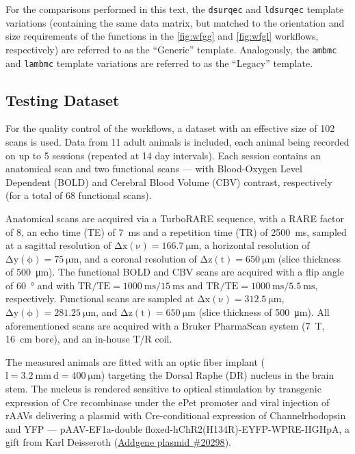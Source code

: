 For the comparisons performed in this text, the \textcolor{mg}{\texttt{dsurqec}} and \textcolor{mg}{\texttt{ldsurqec}} template variations (containing the same data matrix, but matched to the orientation and size requirements of the functions in the \cref{fig:wfgg} and \cref{fig:wfgl} workflows, respectively) are referred to as the “Generic” template.
Analogously, the \textcolor{mg}{\texttt{ambmc}} and \textcolor{mg}{\texttt{lambmc}} template variations are referred to as the “Legacy” template.

\subsection{Testing Dataset}

For the quality control of the workflows, a dataset with an effective size of 102 scans is used.
Data from 11 adult animals is included, each animal being recorded on up to 5 sessions (repeated at 14 day intervals).
Each session contains an anatomical scan and two functional scans --- with Blood-Oxygen Level Dependent (BOLD) \cite{Ogawa1990} and Cerebral Blood Volume (CBV) \cite{Marota1999} contrast, respectively (for a total of 68 functional scans).

Anatomical scans are acquired via a TurboRARE sequence, with a RARE factor of 8, an echo time (TE) of \SI{7}{\milli\second} and a repetition time (TR) of \SI{2500}{\milli\second}, sampled at a sagittal resolution of $\mathrm{\Delta x(\nu)=\SI{166.7}{\micro\meter}}$, a horizontal resolution of $\mathrm{\Delta y(\phi)=\SI{75}{\micro\meter}}$, and a coronal resolution of $\mathrm{\Delta z(t)=\SI{650}{\micro\meter}}$ (slice thickness of \SI{500}{\micro\meter}).
The functional BOLD and CBV scans are acquired with a flip angle of \SI{60}{\degree} and with $\mathrm{TR/TE = \SI{1000}{\milli\second}/\SI{15}{\milli\second}}$ and $\mathrm{TR/TE = \SI{1000}{\milli\second}/\SI{5.5}{\milli\second}}$, respectively.
Functional scans are sampled at $\mathrm{\Delta x(\nu)=\SI{312.5}{\micro\meter}}$, $\mathrm{\Delta y(\phi)=\SI{281.25}{\micro\meter}}$, and $\mathrm{\Delta z(t)=\SI{650}{\micro\meter}}$ (slice thickness of \SI{500}{\micro\meter}).
All aforementioned scans are acquired with a Bruker PharmaScan system (\SI{7}{\tesla}, \SI{16}{\centi\meter} bore), and an in-house T/R coil.

The measured animals are fitted with an optic fiber implant ($\mathrm{l=\SI{3.2}{\milli\meter} \ d=\SI{400}{\micro\meter}}$) targeting the Dorsal Raphe (DR) nucleus in the brain stem.
The nucleus is rendered sensitive to optical stimulation by transgenic expression of Cre recombinase under the ePet promoter \cite{Scott2005} and viral injection of rAAVs delivering a plasmid with Cre-conditional expression of Channelrhodopsin and YFP ---
pAAV-EF1a-double floxed-hChR2(H134R)-EYFP-WPRE-HGHpA, a gift from Karl Deisseroth (\href{https://www.addgene.org/20298/}{Addgene plasmid \#20298}).

